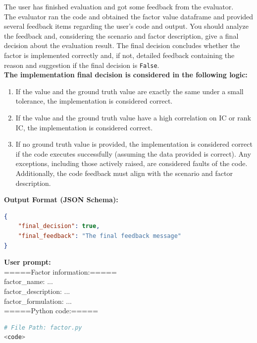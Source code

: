 \documentclass{article}
\begin{document}
\begin{tcolorbox}[
  colback=gray!5, 
  colframe=gray!80,
  title style={fontupper=\bfseries\large},
  title=Implementation Prompt – Factor-Oriented – Code Implementation,
  breakable]
The user has finished evaluation and got some feedback from the evaluator.\\
The evaluator ran the code and obtained the factor value dataframe and provided several feedback items regarding the user's code and output. You should analyze the feedback and, considering the scenario and factor description, give a final decision about the evaluation result. The final decision concludes whether the factor is implemented correctly and, if not, detailed feedback containing the reason and suggestion if the final decision is \texttt{False}.\\

\textbf{The implementation final decision is considered in the following logic:}
\begin{enumerate}
    \item If the value and the ground truth value are exactly the same under a small tolerance, the implementation is considered correct.
    \item If the value and the ground truth value have a high correlation on IC or rank IC, the implementation is considered correct.
    \item If no ground truth value is provided, the implementation is considered correct if the code executes successfully (assuming the data provided is correct). Any exceptions, including those actively raised, are considered faults of the code. Additionally, the code feedback must align with the scenario and factor description.\\
\end{enumerate}

\textbf{Output Format (JSON Schema):}
\begin{lstlisting}[language=json]
{
    "final_decision": true,
    "final_feedback": "The final feedback message"
}
\end{lstlisting}

\hrulefill
\vspace{1mm}

\textcolor{blue!60!black}{\textbf{User prompt:}}\\

=====Factor information:=====\\
factor\_name: ...\\
factor\_description: ...\\
factor\_formulation: ...\\

=====Python code:=====
\begin{lstlisting}[language=Python]
# File Path: factor.py
<code>
\end{lstlisting}


\end{tcolorbox}
\end{document}
